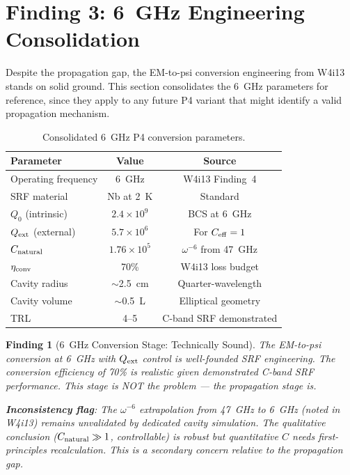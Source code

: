 \documentclass[11pt]{article}
\newtheorem{finding}{Finding}
\newcommand{\ee}[1]{\times 10^{#1}}
\begin{document}
\section{Finding 3: 6~GHz Engineering Consolidation}
\label{sec:6ghz-engineering}

Despite the propagation gap, the EM-to-psi conversion engineering from
W4i13 stands on solid ground. This section consolidates the 6~GHz
parameters for reference, since they apply to any future P4 variant
that might identify a valid propagation mechanism.

\begin{table}[H]
\centering
\caption{Consolidated 6~GHz P4 conversion parameters.}
\label{tab:6ghz-consolidated}
\begin{tabular}{@{}lcc@{}}
\toprule
Parameter & Value & Source \\
\midrule
Operating frequency & 6~GHz & W4i13 Finding~4 \\
SRF material & Nb at 2~K & Standard \\
$Q_0$ (intrinsic) & $2.4\ee{9}$ & BCS at 6~GHz \\
$Q_{\rm ext}$ (external) & $5.7\ee{6}$ & For $C_{\rm eff} = 1$ \\
$C_{\rm natural}$ & $1.76\ee{5}$ & $\omega^{-6}$ from 47~GHz \\
$\eta_{\rm conv}$ & 70\% & W4i13 loss budget \\
Cavity radius & $\sim$2.5~cm & Quarter-wavelength \\
Cavity volume & $\sim$0.5~L & Elliptical geometry \\
TRL & 4--5 & C-band SRF demonstrated \\
\bottomrule
\end{tabular}
\end{table}

\begin{finding}[6~GHz Conversion Stage: Technically Sound]
\label{find:6ghz}
The EM-to-psi conversion at 6~GHz with $Q_{\rm ext}$ control is well-founded
SRF engineering. The conversion efficiency of 70\% is realistic given
demonstrated C-band SRF performance. This stage is NOT the problem ---
the propagation stage is.

\textbf{Inconsistency flag}: The $\omega^{-6}$ extrapolation from 47~GHz
to 6~GHz (noted in W4i13) remains unvalidated by dedicated cavity
simulation. The qualitative conclusion ($C_{\rm natural} \gg 1$,
controllable) is robust but quantitative $C$ needs first-principles
recalculation. This is a secondary concern relative to the propagation gap.
\end{finding}
\end{document}
